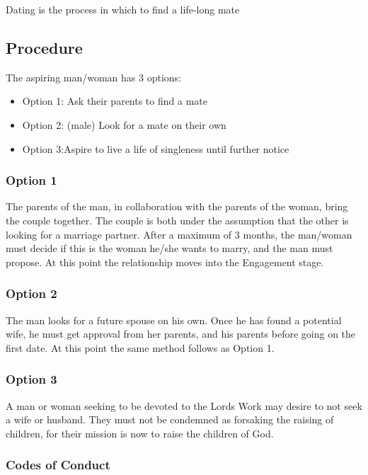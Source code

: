 \documentclass[CSHFoundation.tex]{subfiles}
\begin{document}
Dating is the process in which to find a life-long mate

\subsection{Procedure}

The aspiring man/woman has 3 options:

\begin{itemize}
\item Option 1: Ask their parents to find a mate
\item Option 2: (male) Look for a mate on their own
\item Option 3:Aspire to live a life of singleness until further notice
\end{itemize}

\subsubsection{Option 1}

The parents of the man, in collaboration with the parents of the woman, bring the couple together. The couple is both under the assumption that the other is looking for a marriage partner. After a maximum of 3 months, the man/woman must decide if this is the woman he/she wants to marry, and the man must propose. At this point the relationship moves into the Engagement stage.



\subsubsection{Option 2}

The man  looks for a future spouse on his own. Once he has found a potential wife, he must get approval from her parents, and his parents before going on the first date. At this point the same method follows as Option 1.



\subsubsection{Option 3}

A man or woman seeking to be devoted to the Lords Work may desire to not seek a wife or husband. They must not be condemned as forsaking the raising of children, for their mission is now to raise the children of God.



\subsubsection{Codes of Conduct}
\end{document}

